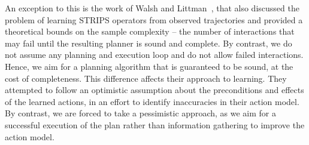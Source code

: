 \documentclass{article}
\begin{document}
	
	An exception to this is the work of Walsh and Littman~, that also discussed the problem of learning STRIPS operators from observed trajectories and provided a theoretical bounds on the sample complexity -- the number of interactions that may fail until the resulting planner is  sound and complete.  By contrast, we do not assume any planning and execution loop and do not allow failed interactions. Hence, we aim for a planning algorithm that is guaranteed to be sound, at the cost of completeness. This difference affects their approach to learning. They attempted to follow an optimistic assumption about the preconditions and effects of the learned actions, in an effort to identify inaccuracies in their action model. By contrast, we are forced to take a pessimistic approach, as we aim for a successful execution of the plan rather than information gathering to improve the action model. 
	
\end{document}
